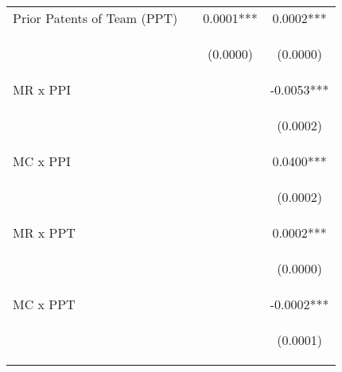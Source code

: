 \begin{center}
\begin{tabular}{lccc}
Prior Patents of Team (PPT) &  & 0.0001*** & 0.0002*** \\
\vspace{4pt} & \begin{footnotesize}\end{footnotesize} & \begin{footnotesize}(0.0000)\end{footnotesize} & \begin{footnotesize}(0.0000)\end{footnotesize} \\
MR x PPI &  &  & -0.0053*** \\
\vspace{4pt} & \begin{footnotesize}\end{footnotesize} & \begin{footnotesize}\end{footnotesize} & \begin{footnotesize}(0.0002)\end{footnotesize} \\
MC x PPI &  &  & 0.0400*** \\
\vspace{4pt} & \begin{footnotesize}\end{footnotesize} & \begin{footnotesize}\end{footnotesize} & \begin{footnotesize}(0.0002)\end{footnotesize} \\
MR x PPT &  &  & 0.0002*** \\
\vspace{4pt} & \begin{footnotesize}\end{footnotesize} & \begin{footnotesize}\end{footnotesize} & \begin{footnotesize}(0.0000)\end{footnotesize} \\
MC x PPT &  &  & -0.0002*** \\
\vspace{4pt} & \begin{footnotesize}\end{footnotesize} & \begin{footnotesize}\end{footnotesize} & \begin{footnotesize}(0.0001)\end{footnotesize} \\

\end{tabular}
\end{center}

